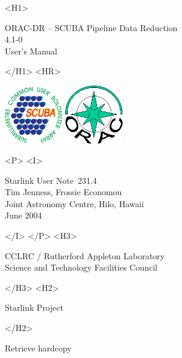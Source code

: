 \documentclass[twoside,11pt]{article}
\newcommand{\stardoccategory}  {Starlink User Note}
\newcommand{\stardocsource}    {sun\stardocnumber}
\newcommand{\stardocnumber}    {231.4}
\newcommand{\stardocauthors}   {Tim Jenness, Frossie Economou\\
Joint Astronomy Centre, Hilo, Hawaii}
\newcommand{\stardocdate}      {June 2004}
\newcommand{\stardoctitle}     {ORAC-DR -- SCUBA Pipeline Data Reduction}
\newcommand{\stardocversion}   {4.1-0}
\newcommand{\stardocmanual}    {User's Manual}
\newcommand{\htmladdnormallink}[2]{#1}
\newcommand{\htmladdimg}[1]{}
\newcommand{\xlabel}[1]{}
\renewcommand{\_}{\texttt{\symbol{95}}}
\begin{document}
\begin{htmlonly}
   \xlabel{}
   \begin{rawhtml} <H1> \end{rawhtml}
      \stardoctitle\\
      \stardocversion\\
      \stardocmanual
   \begin{rawhtml} </H1> <HR> \end{rawhtml}

\includegraphics[width=1.0in]{sun231_sculogo}
\includegraphics[width=1.0in]{sun231_logo}

   \begin{rawhtml} <P> <I> \end{rawhtml}
   \stardoccategory\ \stardocnumber \\
   \stardocauthors \\
   \stardocdate
   \begin{rawhtml} </I> </P> <H3> \end{rawhtml}
      \htmladdnormallink{CCLRC / Rutherford Appleton Laboratory}
                        {http://www.cclrc.ac.uk} \\
      \htmladdnormallink{Science and Technology Facilities Council}
                        {http://www.stfc.ac.uk} \\
   \begin{rawhtml} </H3> <H2> \end{rawhtml}
      \htmladdnormallink{Starlink Project}{http://www.starlink.ac.uk/}
   \begin{rawhtml} </H2> \end{rawhtml}
   \htmladdnormallink{\htmladdimg{source.gif} Retrieve hardcopy}
      {http://www.starlink.ac.uk/cgi-bin/hcserver?\stardocsource}\\


\end{htmlonly}
\end{document}
